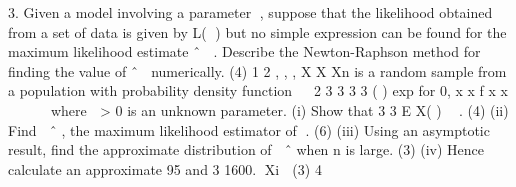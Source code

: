 
3. Given a model involving a parameter , suppose that the likelihood obtained from a
set of data is given by L( ) but no simple expression can be found for the maximum
likelihood estimate
ˆ
 .
Describe the Newton-Raphson method for finding the value of
ˆ

numerically.
(4)
1 2 , , , X X Xn
is a random sample from a population with probability density
function
 
2 3
3 3
3
( ) exp for 0, x x f x x
 
  
where  > 0 is an unknown parameter.
(i) Show that
3 3 E X( )  .
(4)
(ii) Find

ˆ
,
the maximum likelihood estimator of .
(6)
(iii) Using an asymptotic result, find the approximate distribution of

ˆ
when n is
large.
(3)
(iv) Hence calculate an approximate 95%
and
3
1600. Xi 
(3)
4
